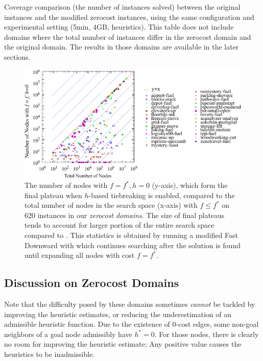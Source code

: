 \begin{table}[htbp]
 \centering
 
 \caption{
 Coverage comparison (the number of instances solved) 
 between the original instances and the modified zerocost instances,
 using the same configuration and experimental setting (5min, 4GB, \mands heuristics).
 This table does not include domains where the total number of instances
 differ in the zerocost domain and the original domain. The results in
 those domains are available in the later sections.
 }
 \label{tbl:mands-zerocost-std}
\end{table}

\begin{figure}[htbp]
  \centering
  \includegraphics{tables/aaai16-frontier/zerocost/lmcut_frontier-front.pdf}
  \caption{
 The number of nodes with $f=f^*, h=0$ (y-axis), which form
  the final plateau when $h$-based tiebreaking is enabled, compared to
 the total number of nodes in the search space (x-axis) with
 $f\leq f^*$ on 620 instances in our \emph{zerocost domains}.
 The size of final plateaus tends to account for larger portion of the
 entire search space compared to .
 This statistics is obtained by running a modified Fast Downward with
 \lmcut which continues searching after the solution is found
 until expanding all nodes with cost $f=f^*$.
 }
 \label{fig:plateau-zerocost}
\end{figure}

\subsection{Discussion on Zerocost Domains}

Note that the difficulty posed by these domains sometimes \emph{cannot}
be tackled by improving the heuristic estimates, or reducing the
underestimation of an admissible heuristic function.  Due to the
existence of 0-cost edges, some non-goal neighbors of a goal node 
admissibly have $h^*=0$. For those nodes,
there is clearly no room for improving the heuristic estimate; Any positive
value causes the heuristics to be inadmissible.

